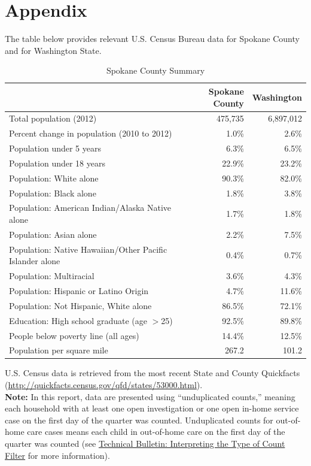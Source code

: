 \documentclass{article}\usepackage[]{graphicx}\usepackage[]{color}
\begin{document}
\vspace{-18pt}

\newpage

\section{Appendix}

The table below provides relevant U.S. Census Bureau data for Spokane County and for Washington State. 
\nopagebreak[3]
\begin{table}[ht]
\centering
\caption{Spokane County Summary} 
\begin{tabular}{lrr}
  \toprule
 & Spokane County & Washington \\ 
  \midrule
Total population (2012) & 475,735 & 6,897,012 \\ 
  Percent change in population (2010 to 2012) & 1.0\% & 2.6\% \\ 
  Population under 5 years & 6.3\% & 6.5\% \\ 
  Population under 18 years & 22.9\% & 23.2\% \\ 
  Population: White alone & 90.3\% & 82.0\% \\ 
  Population: Black alone & 1.8\% & 3.8\% \\ 
  Population: American Indian/Alaska Native alone & 1.7\% & 1.8\% \\ 
  Population: Asian alone & 2.2\% & 7.5\% \\ 
  Population: Native Hawaiian/Other Pacific Islander alone & 0.4\% & 0.7\% \\ 
  Population: Multiracial & 3.6\% & 4.3\% \\ 
  Population: Hispanic or Latino Origin & 4.7\% & 11.6\% \\ 
  Population: Not Hispanic, White alone & 86.5\% & 72.1\% \\ 
  Education: High school graduate (age $>$25) & 92.5\% & 89.8\% \\ 
  People below poverty line (all ages) & 14.4\% & 12.5\% \\ 
  Population per square mile & 267.2 & 101.2 \\ 
   \bottomrule
\end{tabular}
\end{table}



U.S. Census data is retrieved from the most recent State and County Quickfacts (\href{http://quickfacts.census.gov/qfd/states/53000.html}{http://quickfacts.census.gov/qfd/states/53000.html}).\\

\textbf{Note:} In this report, data are presented using ``unduplicated counts,'' meaning each household with at least one open investigation or one open in-home service case on the first day of the quarter was counted. Unduplicated counts for out-of-home care cases means each child in out-of-home care on the first day of the quarter was counted (see \href{http://http://www.partnersforourchildren.org/publications/using-different-count-types-data-portal}{Technical Bulletin: Interpreting the Type of Count Filter} for more information).  
\end{document}
